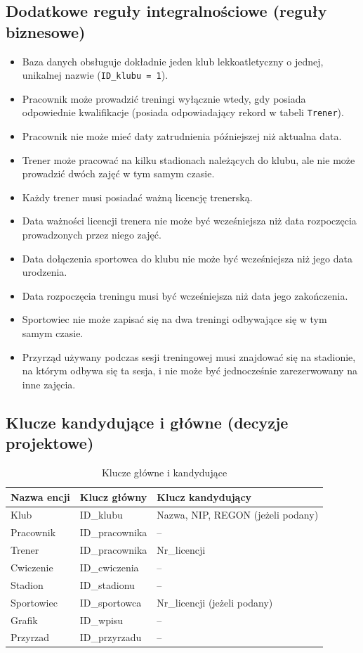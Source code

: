 \documentclass[11pt,a4paper]{article}
\begin{document}
\subsection{Dodatkowe reguły integralnościowe (reguły biznesowe)}
\begin{itemize}
    \item Baza danych obsługuje dokładnie jeden klub lekkoatletyczny o jednej, unikalnej nazwie (\texttt{ID\_klubu = 1}).
    \item Pracownik może prowadzić treningi wyłącznie wtedy, gdy posiada odpowiednie kwalifikacje (posiada odpowiadający rekord w tabeli \texttt{Trener}).
    \item Pracownik nie może mieć daty zatrudnienia późniejszej niż aktualna data.
    \item Trener może pracować na kilku stadionach należących do klubu, ale nie może prowadzić
        dwóch zajęć w tym samym czasie.
    \item Każdy trener musi posiadać ważną licencję trenerską.
    \item Data ważności licencji trenera nie może być wcześniejsza niż data rozpoczęcia prowadzonych
        przez niego zajęć.
    \item Data dołączenia sportowca do klubu nie może być wcześniejsza niż jego data urodzenia.
    \item Data rozpoczęcia treningu musi być wcześniejsza niż data jego zakończenia.
    \item Sportowiec nie może zapisać się na dwa treningi odbywające się w tym samym czasie.
    \item Przyrząd używany podczas sesji treningowej musi znajdować się na stadionie, na którym odbywa się ta sesja, i nie może być jednocześnie zarezerwowany na inne zajęcia.
\end{itemize}

\subsection{Klucze kandydujące i główne (decyzje projektowe)}
\begin{table}[H]
\centering
\small
\begin{tabularx}{\textwidth}{|X|X|X|}
\hline
\textbf{Nazwa encji} & \textbf{Klucz główny} & \textbf{Klucz kandydujący} \\
\hline
Klub & ID\_klubu & Nazwa, NIP, REGON (jeżeli podany) \\
\hline
Pracownik & ID\_pracownika & -- \\
\hline
Trener & ID\_pracownika & Nr\_licencji \\
\hline
Cwiczenie & ID\_cwiczenia & -- \\
\hline
Stadion & ID\_stadionu & -- \\
\hline
Sportowiec & ID\_sportowca & Nr\_licencji (jeżeli podany) \\
\hline
Grafik & ID\_wpisu & -- \\
\hline
Przyrzad & ID\_przyrzadu & -- \\
\hline
\end{tabularx}
\caption{Klucze główne i kandydujące}
\label{tab:klucze}
\end{table}
\end{document}
